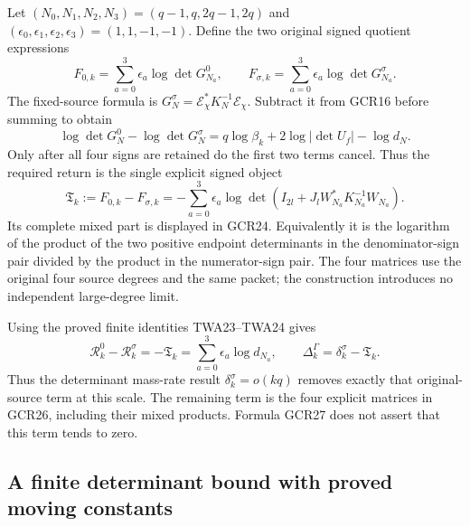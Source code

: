 Let $(N_0,N_1,N_2,N_3)=(q-1,q,2q-1,2q)$ and
$(\epsilon_0,\epsilon_1,\epsilon_2,\epsilon_3)=(1,1,-1,-1)$.
Define the two original signed quotient expressions
\[
 F_{0,k}=\sum_{a=0}^3\epsilon_a\log\det G_{N_a}^0,\qquad
 F_{\sigma,k}=\sum_{a=0}^3\epsilon_a\log\det G_{N_a}^\sigma.
\]
The fixed-source formula is
$G_N^\sigma=\mathcal E_\chi^*K_N^{-1}\mathcal E_\chi$.
Subtract it from GCR16 before summing to obtain
\[
 \log\det G_N^0-\log\det G_N^\sigma
      =q\log\beta_k+2\log|\det U_f|-\log d_N.
\tag{GCR25}
\]
Only after all four signs are retained do the first two terms
cancel. Thus the required return is the single explicit signed
object
\[
 \boxed{\quad
 \mathfrak T_k:=F_{0,k}-F_{\sigma,k}
    =-\sum_{a=0}^3\epsilon_a\log
       \det\!\left(I_{2l}
           +J_lW_{N_a}^*K_{N_a}^{-1}W_{N_a}\right).
 \quad}\tag{GCR26}
\]
Its complete mixed part is displayed in GCR24.
Equivalently it is the logarithm of the product of the two
positive endpoint determinants in the denominator-sign pair
divided by the product in the numerator-sign pair.
The four matrices use the original four source degrees and
the same packet; the construction introduces no independent
large-degree limit.

Using the proved finite identities TWA23--TWA24 gives
\[
 \mathcal R_k^0-\mathcal R_k^\sigma=-\mathfrak T_k
       =\sum_{a=0}^3\epsilon_a\log d_{N_a},\qquad
 \Delta_k^\Gamma=\delta_k^\sigma-\mathfrak T_k.
\tag{GCR27}
\]
Thus the determinant mass-rate result
$\delta_k^\sigma=o(kq)$ removes exactly that original-source
term at this scale. The remaining term is the four explicit
matrices in GCR26, including their mixed products. Formula
GCR27 does not assert that this term tends to zero.

\subsection{A finite determinant bound with proved moving constants}

